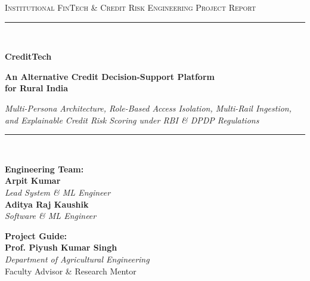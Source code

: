 \documentclass[11pt,a4paper,oneside]{report}
\begin{document}

\begin{titlepage}
\centering
\vspace*{0.5cm}

{\scshape\Large Institutional FinTech \& Credit Risk Engineering Project Report \par}
\vspace{0.8cm}

{\color{primary}\rule{\linewidth}{2pt}}\\[0.4cm]

{\Huge\bfseries\color{primary} CreditTech \par}
\vspace{0.3cm}
{\Large\bfseries\color{secondary} An Alternative Credit Decision-Support Platform \\ for Rural India \par}
\vspace{0.2cm}
{\large\itshape Multi-Persona Architecture, Role-Based Access Isolation, Multi-Rail Ingestion, and Explainable Credit Risk Scoring under RBI \& DPDP Regulations \par}

{\color{primary}\rule{\linewidth}{1pt}}\\[1.5cm]

\noindent
\begin{minipage}[t]{0.48\textwidth}
  \begin{flushleft}
    {\large\textbf{\color{primary}Engineering Team:}}\\[0.25cm]
    \textbf{\color{secondary}Arpit Kumar}\\
    {\small\textit{Lead System \& ML Engineer}}\\[0.25cm]
    \textbf{\color{secondary}Aditya Raj Kaushik}\\
    {\small\textit{Software \& ML Engineer}}
  \end{flushleft}
\end{minipage}
\hfill
\begin{minipage}[t]{0.48\textwidth}
  \begin{flushright}
    {\large\textbf{\color{primary}Project Guide:}}\\[0.25cm]
    \textbf{\color{secondary}Prof. Piyush Kumar Singh}\\
    {\small\textit{Department of Agricultural Engineering}}\\[0.25cm]
    {\footnotesize\color{slate}Faculty Advisor \& Research Mentor}
  \end{flushright}
\end{minipage}


\end{titlepage}
\end{document}
